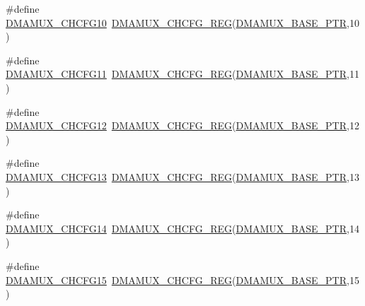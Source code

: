 \begin{DoxyCompactItemize}
\item 
\#define \hyperlink{group___d_m_a_m_u_x___register___accessor___macros_ga8cd0b61f68d8a523c35ebf55cdf1450c}{D\+M\+A\+M\+U\+X\+\_\+\+C\+H\+C\+F\+G10}~\hyperlink{group___d_m_a_m_u_x___register___accessor___macros_ga10cf09fe06ed04dc004b7b41da7cbf0d}{D\+M\+A\+M\+U\+X\+\_\+\+C\+H\+C\+F\+G\+\_\+\+R\+EG}(\hyperlink{group___d_m_a_m_u_x___peripheral_gad38c261e5de04658dbad762d40e8904e}{D\+M\+A\+M\+U\+X\+\_\+\+B\+A\+S\+E\+\_\+\+P\+TR},10)
\item 
\#define \hyperlink{group___d_m_a_m_u_x___register___accessor___macros_gaa486d430500d0203481685f0485228ca}{D\+M\+A\+M\+U\+X\+\_\+\+C\+H\+C\+F\+G11}~\hyperlink{group___d_m_a_m_u_x___register___accessor___macros_ga10cf09fe06ed04dc004b7b41da7cbf0d}{D\+M\+A\+M\+U\+X\+\_\+\+C\+H\+C\+F\+G\+\_\+\+R\+EG}(\hyperlink{group___d_m_a_m_u_x___peripheral_gad38c261e5de04658dbad762d40e8904e}{D\+M\+A\+M\+U\+X\+\_\+\+B\+A\+S\+E\+\_\+\+P\+TR},11)
\item 
\#define \hyperlink{group___d_m_a_m_u_x___register___accessor___macros_gad85d6c943c6d1ed2d7f39925fed5b550}{D\+M\+A\+M\+U\+X\+\_\+\+C\+H\+C\+F\+G12}~\hyperlink{group___d_m_a_m_u_x___register___accessor___macros_ga10cf09fe06ed04dc004b7b41da7cbf0d}{D\+M\+A\+M\+U\+X\+\_\+\+C\+H\+C\+F\+G\+\_\+\+R\+EG}(\hyperlink{group___d_m_a_m_u_x___peripheral_gad38c261e5de04658dbad762d40e8904e}{D\+M\+A\+M\+U\+X\+\_\+\+B\+A\+S\+E\+\_\+\+P\+TR},12)
\item 
\#define \hyperlink{group___d_m_a_m_u_x___register___accessor___macros_gaf5faf449e854cb5b9a64613f784ff082}{D\+M\+A\+M\+U\+X\+\_\+\+C\+H\+C\+F\+G13}~\hyperlink{group___d_m_a_m_u_x___register___accessor___macros_ga10cf09fe06ed04dc004b7b41da7cbf0d}{D\+M\+A\+M\+U\+X\+\_\+\+C\+H\+C\+F\+G\+\_\+\+R\+EG}(\hyperlink{group___d_m_a_m_u_x___peripheral_gad38c261e5de04658dbad762d40e8904e}{D\+M\+A\+M\+U\+X\+\_\+\+B\+A\+S\+E\+\_\+\+P\+TR},13)
\item 
\#define \hyperlink{group___d_m_a_m_u_x___register___accessor___macros_ga1e88648507c6b0683b2a904f3dc274e1}{D\+M\+A\+M\+U\+X\+\_\+\+C\+H\+C\+F\+G14}~\hyperlink{group___d_m_a_m_u_x___register___accessor___macros_ga10cf09fe06ed04dc004b7b41da7cbf0d}{D\+M\+A\+M\+U\+X\+\_\+\+C\+H\+C\+F\+G\+\_\+\+R\+EG}(\hyperlink{group___d_m_a_m_u_x___peripheral_gad38c261e5de04658dbad762d40e8904e}{D\+M\+A\+M\+U\+X\+\_\+\+B\+A\+S\+E\+\_\+\+P\+TR},14)
\item 
\#define \hyperlink{group___d_m_a_m_u_x___register___accessor___macros_gaa445f96fc79c66e60c1a1431561075dd}{D\+M\+A\+M\+U\+X\+\_\+\+C\+H\+C\+F\+G15}~\hyperlink{group___d_m_a_m_u_x___register___accessor___macros_ga10cf09fe06ed04dc004b7b41da7cbf0d}{D\+M\+A\+M\+U\+X\+\_\+\+C\+H\+C\+F\+G\+\_\+\+R\+EG}(\hyperlink{group___d_m_a_m_u_x___peripheral_gad38c261e5de04658dbad762d40e8904e}{D\+M\+A\+M\+U\+X\+\_\+\+B\+A\+S\+E\+\_\+\+P\+TR},15)

\end{DoxyCompactItemize}
